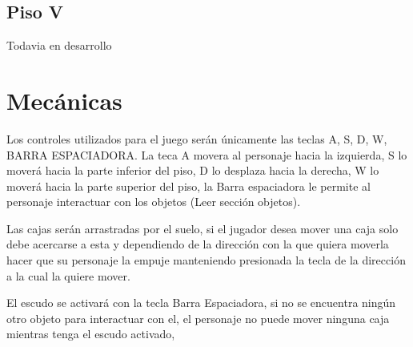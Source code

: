 \documentclass{article}
\begin{document}
\subsection{Piso V}
Todavia en desarrollo
\section{Mecánicas}\label{intro}
Los controles utilizados para el juego serán únicamente las teclas A, S, D, W, BARRA ESPACIADORA. La teca A movera al personaje hacia la izquierda, S lo moverá hacia la parte inferior del piso, D lo desplaza hacia la derecha, W lo moverá hacia la parte superior del piso, la Barra espaciadora le permite al personaje interactuar con los objetos (Leer sección objetos).

Las cajas serán arrastradas por el suelo, si el jugador desea mover una caja solo debe acercarse a esta y dependiendo de la dirección con la que quiera moverla hacer que su personaje la empuje manteniendo presionada la tecla de la dirección a la cual la quiere mover.

El escudo se activará con la tecla Barra Espaciadora, si no se encuentra ningún otro objeto para interactuar con el, el personaje no puede mover ninguna caja mientras tenga el escudo activado,
\end{document}
